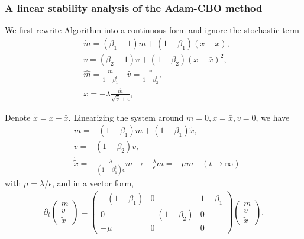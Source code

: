 \documentclass{beamer}
\begin{document}
\begin{frame}
	\frametitle{A linear stability analysis of the Adam-CBO method}
	 We first rewrite Algorithm into a continuous form and ignore the stochastic term
	\begin{align}
&\dot m = (\beta_1 -1) m + (1-\beta_1) (x-\bar{x}),\\
&\dot v = (\beta_2 -1) v + (1-\beta_2) (x-\bar{x})^2,\\
&\hat{m} = \frac{m}{1-\beta_1^t} \quad  \hat{v} = \frac{v}{1-\beta_2^t}, \\
&\dot x =  - \lambda \frac{\hat{m}}{\sqrt{\hat{v}}+\epsilon},
	\end{align}

\end{frame}
\begin{frame}
	Denote $\tilde{x} = x - \bar{x}$. Linearizing the system around $m = 0, x = \bar{x}, v = 0 $, we have
	\begin{align}	
	&\dot m = -(1-\beta_1) m + (1-\beta_1) \tilde{x},\\
	&\dot v = -(1-\beta_2)v, \\
	&\dot {\tilde{x}} = -\frac{\lambda }{(1-\beta_1^t)\epsilon}m \rightarrow -\frac{\lambda}{\epsilon} m = -\mu m  \quad (t \rightarrow \infty)
	\end{align}
	with $\mu=\lambda/\epsilon$, and in a vector form,
	\begin{equation}
	\begin{aligned}
	\partial_t	\left(\begin{matrix}
			m \\ v \\ \tilde x
		\end{matrix}\right) = 
	\left(\begin{matrix}
		-(1-\beta_1) & 0 & 1-\beta_1\\ 
		0 &  -(1-\beta_2) & 0  \\
		 -\mu & 0 & 0  
	\end{matrix}\right) 
	\left(\begin{matrix}
	m \\ v \\ \tilde x
	\end{matrix}\right). 
	\end{aligned}
	\end{equation}
\end{frame}
\end{document}
